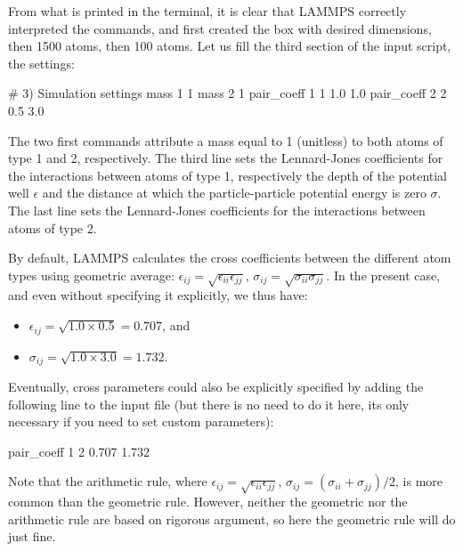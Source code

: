 \noindent From what is printed in the terminal, it is clear that
LAMMPS correctly interpreted the commands, and first created
the box with desired dimensions, then 1500 atoms, then 100
atoms.
Let us fill the third section of the input script, the settings:

\begin{lcverbatim}
# 3) Simulation settings
mass 1 1
mass 2 1
pair_coeff 1 1 1.0 1.0
pair_coeff 2 2 0.5 3.0
\end{lcverbatim}

\noindent The two first commands attribute a mass
equal to 1 (unitless) to both atoms of type 1 and 2,
respectively. The third line sets the Lennard-Jones
coefficients for the interactions between atoms of type 1,
respectively the depth of the potential well
$\epsilon$ and the distance at which the
particle-particle potential energy is zero $\sigma$. 
The last line sets the Lennard-Jones coefficients for
the interactions between atoms of type 2.

\begin{tcolorbox}[colback=mylightblue!5!white,colframe=mylightblue!75!black,title=About cross parameters]
By default, LAMMPS calculates the cross coefficients between the different atom types
using geometric average: 
$\epsilon_{ij} = \sqrt{\epsilon_{ii} \epsilon_{jj}}$,
$\sigma_{ij} = \sqrt{\sigma_{ii} \sigma_{jj}}$. 
In the present case, and even without specifying it explicitly, we thus have:
\begin{itemize}
\item $\epsilon_{ij} = \sqrt{1.0 \times 0.5} = 0.707$, and 
\item $\sigma_{ij} = \sqrt{1.0 \times 3.0} = 1.732$.
\end{itemize}
Eventually, cross parameters could also be explicitly specified by adding the following 
line to the input file (but there is no need to do it here, its only necessary if you need 
to set custom parameters):
\begin{lcverbatim}

pair_coeff 1 2 0.707 1.732 
\end{lcverbatim}

\noindent Note that the arithmetic rule, where 
$\epsilon_{ij} = \sqrt{\epsilon_{ii} \epsilon_{jj}}$,
$\sigma_{ij} = (\sigma_{ii}+\sigma_{jj})/2$, 
is more common than the geometric rule. However, neither the geometric nor the
arithmetic rule are based on rigorous argument, so here
the geometric rule will do just fine. 
\end{tcolorbox}

